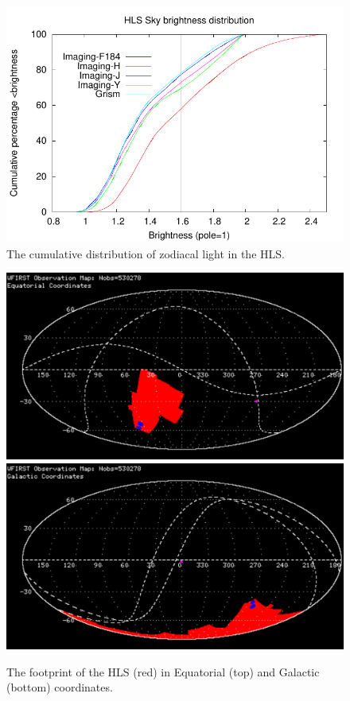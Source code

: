\begin{figure}
\includegraphics[width=5in]{Plots/hlsbright.pdf}
\caption{\label{fig:hls_bright}The cumulative distribution of zodiacal light in the HLS.}
\end{figure}

\begin{figure}
\includegraphics[width=6in]{Plots/sky-equ.pdf}
\includegraphics[width=6in]{Plots/sky-gal.pdf}
\caption{\label{fig:footprint}The footprint of the HLS (red) in Equatorial (top) and Galactic (bottom) coordinates.}
\end{figure}

